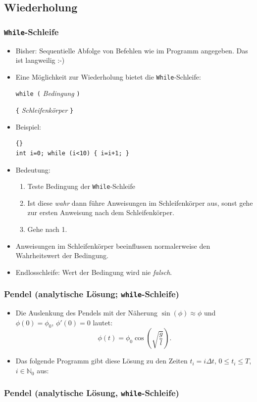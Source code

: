 \documentclass[ignorenonframetext,12pt]{beamer}
\theoremstyle{definition}
\theoremstyle{definition}
\begin{document}
\subsection{Wiederholung}

\begin{frame}[fragile]
\frametitle{\lstinline{While}-Schleife}
\begin{itemize}
\item Bisher: Sequentielle Abfolge von Befehlen wie im Programm
  angegeben. Das ist langweilig :-)
\item Eine Möglichkeit zur Wiederholung bietet die
  \lstinline{While}-Schleife:

\lstinline{while (} \textsl{Bedingung} \lstinline{)}

\lstinline!{! \textsl{Schleifenkörper} \lstinline!}!

\item Beispiel:
{\scriptsize\begin{lstlisting}{}
int i=0; while (i<10) { i=i+1; }
\end{lstlisting}}

\item Bedeutung:
\begin{enumerate}
\item Teste Bedingung der \lstinline{While}-Schleife
\item Ist diese \textsl{wahr} dann führe Anweisungen im
  Schleifenkörper aus, sonst gehe zur ersten Anweisung nach dem
  Schleifenkörper.
\item Gehe nach 1.
\end{enumerate}
\item Anweisungen im Schleifenkörper beeinflussen normalerweise den Wahrheitswert der
  Bedingung.
\item Endlosschleife: Wert der Bedingung wird nie \textsl{falsch}.
\end{itemize}
\end{frame}

\begin{frame}[fragile]
\frametitle{Pendel (analytische Lösung; \lstinline{while}-Schleife)}
\begin{itemize}
\item Die Auslenkung des Pendels mit der Näherung
  $\sin(\phi)\approx\phi$ und $\phi(0)=\phi_0$, $\phi'(0)=0$ lautet:
$$ \phi(t) = \phi_0 \cos\left(\sqrt{\frac{g}{l}}\right) .$$
\item Das folgende Programm gibt diese Lösung zu den Zeiten $t_i=i
  \Delta t$, $0\leq t_i \leq T$, $i\in\mathbb{N}_0$ aus:
\end{itemize}
\end{frame}
\begin{frame}[fragile]
\frametitle<presentation>{Pendel (analytische Lösung, \lstinline{while}-Schleife)}

\end{frame}
\end{document}
